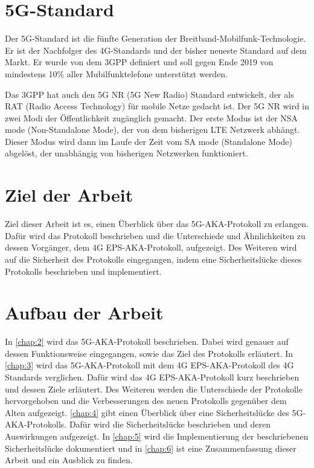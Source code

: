 \section{5G-Standard}
Der 5G-Standard ist die fünfte Generation der Breitband-Mobilfunk-Technologie. %
Er ist der Nachfolger des 4G-Standards und der bisher neueste Standard auf dem Markt.
Er wurde von dem 3GPP definiert und soll gegen Ende 2019 von mindestens 10\% aller Mubilfunktelefone unterstützt werden. %

Das 3GPP hat auch den 5G NR (5G New Radio) Standard entwickelt, der als RAT (Radio Access Technology) für mobile Netze gedacht ist. %
Der 5G NR wird in zwei Modi der Öffentlichkeit zugänglich gemacht. 
Der erste Modus ist der NSA mode (Non-Standalone Mode), der von dem bisherigen LTE Netzwerk abhängt. %
Dieser Modus wird dann im Laufe der Zeit vom SA mode (Standalone Mode) abgelöst, der unabhängig von bisherigen Netzwerken funktioniert. %


\section{Ziel der Arbeit}
Ziel dieser Arbeit ist es, einen Überblick über das 5G-AKA-Protokoll zu erlangen. Dafür wird das Protokoll beschrieben und die Unterschiede und Ähnlichkeiten zu dessen Vorgänger, dem 4G EPS-AKA-Protokoll, aufgezeigt. Des Weiteren wird auf die Sicherheit des Protokolls eingegangen, indem eine Sicherheitslücke dieses Protokolls beschrieben und implementiert. %


\section{Aufbau der Arbeit}
In \cref{chap:2} wird das 5G-AKA-Protokoll beschrieben. 
Dabei wird genauer auf dessen Funktionsweise eingegangen, sowie das Ziel des Protokolls erläutert. In \cref{chap:3} wird das 5G-AKA-Protokoll mit dem 4G EPS-AKA-Protokoll des 4G Standards verglichen. 
Dafür wird das 4G EPS-AKA-Protokoll kurz beschrieben und dessen Ziele erläutert. 
Des Weiteren werden die Unterschiede der Protokolle hervorgehoben und die Verbesserungen des neuen Protokolls gegenüber dem Alten aufgezeigt.
\cref{chap:4} gibt einen Überblick über eine Sicherheitslücke des 5G-AKA-Protokolls. 
Dafür wird die Sicherheitslücke beschrieben und deren Auswirkungen aufgezeigt. 
In \cref{chap:5} wird die Implementierung der beschriebenen Sicherheitslücke dokumentiert und in \cref{chap:6} ist eine Zusammenfassung dieser Arbeit und ein Ausblick zu finden.
